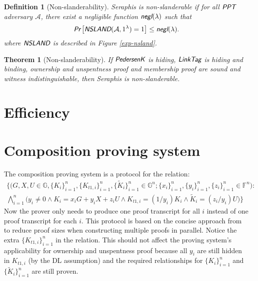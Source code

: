 \documentclass{article}
\theoremstyle{plain}
\newtheorem{definition}{Definition}[section]
\newtheorem{theorem}{Theorem}[section]
\theoremstyle{remark}
\begin{document}
\begin{definition}[Non-slanderability]
Seraphis is non-slanderable if for all $\emph{\textsf{PPT}}$ adversary $\mathcal{A}$, there exist a negligible function $\emph{\textsf{negl}}(\lambda)$ such that
\begin{align*}
\emph{\textsf{Pr}}
\left[
\emph{\textsf{NSLAND}}(\mathcal{A}, 1^{\lambda})=1
\right]
\le \emph{\textsf{negl}}(\lambda).
\end{align*}
where $\emph{\textsf{NSLAND}}$ is described in Figure \ref{exp-nsland}.
\end{definition}
\begin{theorem}[Non-slanderability]\label{thm-nsland}
If $\emph{\textsf{PedersenK}}$ is hiding, $\emph{\textsf{LinkTag}}$ is hiding and binding, ownership and unspentness proof and membership proof are sound and witness indistinguishable, then Seraphis is non-slanderable.
\end{theorem}

\section{Efficiency}




\appendix

\section{Composition proving system}\label{comp-prov}
The composition proving system is a protocol for the relation:
\begin{multline*}
\Big\{\big(G, X, U\in\mathbb{G}, \{K_i\}_{i=1}^n, \{K_{t1,i}\}_{i=1}^n, \{\tilde{K}_i\}_{i=1}^n \in\mathbb{G}^n; \{x_i\}_{i=1}^n, \{y_i\}_{i=1}^n, \{z_i\}_{i=1}^n \in\mathbb{F}^n\big): \\ \bigwedge_{i=1}^n{\big(y_i \ne 0 \wedge K_i = x_i G + y_i X + z_i U \wedge K_{t1,i} = (1/y_i)K_i \wedge \tilde{K}_i = (z_i/y_i)U\big)} \Big\}
\end{multline*}
Now the prover only needs to produce one proof transcript for all $i$ instead of one proof transcript for each $i$. This protocol is based on the concise approach from \cite{clsag} to reduce proof sizes when constructing multiple proofs in parallel. Notice the extra $\{K_{t1,i}\}_{i=1}^n$ in the relation. This should not affect the proving system's applicability for ownership and unspentness proof because all $y_i$ are still hidden in $K_{t1,i}$ (by the DL assumption) and the required relationships for $\{K_i\}_{i=1}^n$ and $\{\tilde{K}_i\}_{i=1}^n$ are still proven.
\end{document}
